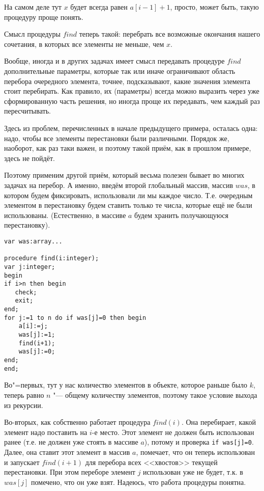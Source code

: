 На самом деле тут $x$ будет всегда равен $a[i-1]+1$, просто, может быть, такую 
процедуру проще понять.

Смысл процедуры $find$ теперь такой: перебрать все возможные окончания нашего 
сочетания, в которых все элементы не меньше, чем $x$.

Вообще, иногда и в других задачах имеет смысл передавать процедуре $find$ 
дополнительные параметры, которые так или иначе ограничивают область перебора 
очередного элемента, точнее, подсказывают, какие значения элемента стоит 
перебирать. Как правило, их (параметры) всегда можно выразить через уже 
сформированную часть решения, но иногда проще их передавать, чем каждый раз пересчитывать.


Здесь из проблем, перечисленных в начале предыдущего примера, осталась одна: 
надо, чтобы все элементы перестановки были различными. Порядок же, наоборот, 
как раз таки важен, и поэтому такой приём, как в прошлом примере, здесь не 
пойдёт. 

Поэтому применим другой приём, который весьма полезен бывает во многих задачах 
на перебор. А именно, введём второй глобальный массив, массив $was$, в котором 
будем фиксировать, использовали ли мы каждое число. Т.е. очередным элементом в 
перестановку будем ставить только те числа, которые ещё не были использованы.
(Естественно, в массиве $a$ будем хранить получающуюся перестановку).

\begin{codesampleo}\begin{verbatim}
var was:array...

procedure find(i:integer);
var j:integer;
begin
if i>n then begin
   check;
   exit;
end;
for j:=1 to n do if was[j]=0 then begin
    a[i]:=j;
    was[j]:=1;
    find(i+1);
    was[j]:=0;
end;
end;
\end{verbatim}\end{codesampleo}

Во"=первых, тут у нас количество элементов в объекте, которое раньше было $k$, 
теперь равно $n$ "--- общему количеству элементов, поэтому такое условие выхода из 
рекурсии.

Во-вторых, как собственно работает процедура $find(i)$. Она перебирает, какой 
элемент надо поставить на $i$-е место. Этот элемент не должен быть использован 
ранее (т.е. не должен уже стоять в массиве $a$), потому и проверка \texttt{if was[j]=0}.
Далее, она ставит этот элемент в массив $a$, помечает, что он теперь 
использован и запускает $find(i+1)$ для перебора всех <<хвостов>> текущей 
перестановки. При этом переборе элемент $j$ использован уже не будет, т.к. в 
$was[j]$ помечено, что он уже взят. Надеюсь, что работа процедуры понятна.

